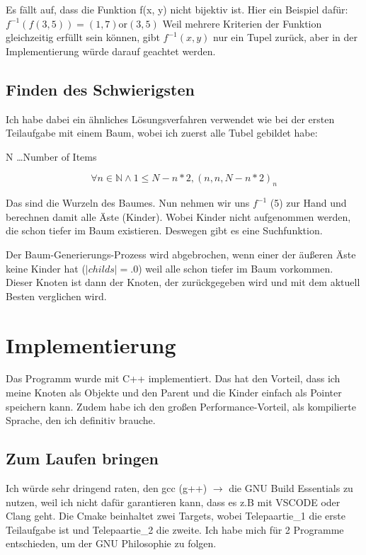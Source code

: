 \documentclass{article}
\begin{document}
Es fällt auf, dass die Funktion f(x, y) nicht bijektiv ist. Hier ein Beispiel dafür: \(f^{-1}(f(3, 5)) = (1, 7)  \text{or} (3,5) \)
Weil mehrere Kriterien der Funktion gleichzeitig erfüllt sein können, gibt \(f^{-1}(x, y) \) nur ein Tupel zurück, aber in der Implementierung würde darauf geachtet werden.

\subsection*{ Finden des Schwierigsten}

Ich habe dabei ein ähnliches Lösungsverfahren verwendet wie bei der ersten Teilaufgabe mit einem Baum, wobei ich zuerst alle Tubel gebildet habe:

N \dots Number of Items

\begin{equation}
	\forall n \in \mathbb{N}  \wedge 1 \leq N - n * 2, (n , n , N - n * 2)_n
\end{equation}

Das sind die Wurzeln des Baumes. Nun nehmen wir uns \(f^{-1}\) (5) zur Hand und berechnen damit alle Äste (Kinder). Wobei Kinder nicht aufgenommen werden, die schon tiefer im Baum existieren. Deswegen gibt es eine Suchfunktion.

Der Baum-Generierungs-Prozess wird abgebrochen, wenn einer der äußeren Äste keine Kinder hat (\(|childs| =. 0 \)) weil alle schon tiefer im Baum vorkommen. Dieser Knoten ist dann der Knoten, der zurückgegeben wird und mit dem aktuell Besten verglichen wird.

\section*{ Implementierung }
Das Programm wurde mit C++ implementiert. Das hat den Vorteil, dass ich meine Knoten als Objekte und den Parent und die Kinder einfach als Pointer speichern kann. Zudem habe ich den großen Performance-Vorteil, als kompilierte Sprache, den ich definitiv brauche.

\subsection*{ Zum Laufen bringen }

Ich würde sehr dringend raten, den gcc (g++) \(\rightarrow\) die GNU Build Essentials zu nutzen, weil ich nicht dafür garantieren kann, dass es z.B mit VSCODE oder Clang geht. Die Cmake beinhaltet zwei Targets, wobei Telepaartie\_1 die erste Teilaufgabe ist und Telepaartie\_2 die zweite. Ich habe mich für 2 Programme entschieden, um der GNU Philosophie zu folgen.
\end{document}
